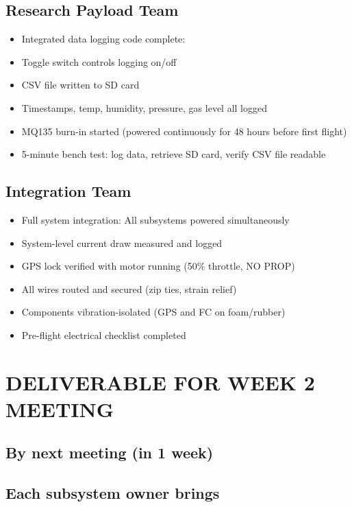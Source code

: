 \documentclass[11pt,letterpaper]{article}
\begin{document}
{\subsection{Research Payload Team}

\begin{itemize}
  \item Integrated data logging code complete:
  \item Toggle switch controls logging on/off
  \item CSV file written to SD card
  \item Timestamps, temp, humidity, pressure, gas level all logged
  \item MQ135 burn-in started (powered continuously for 48 hours before first flight)
  \item 5-minute bench test: log data, retrieve SD card, verify CSV file readable
\end{itemize}

\subsection{Integration Team}

\begin{itemize}
  \item Full system integration: All subsystems powered simultaneously
  \item System-level current draw measured and logged
  \item GPS lock verified with motor running (50\% throttle, NO PROP)
  \item All wires routed and secured (zip ties, strain relief)
  \item Components vibration-isolated (GPS and FC on foam/rubber)
  \item Pre-flight electrical checklist completed
\end{itemize}

\section{DELIVERABLE FOR WEEK 2 MEETING}

\subsection{By next meeting (in 1 week)}

\subsection{Each subsystem owner brings}

}
\end{document}
